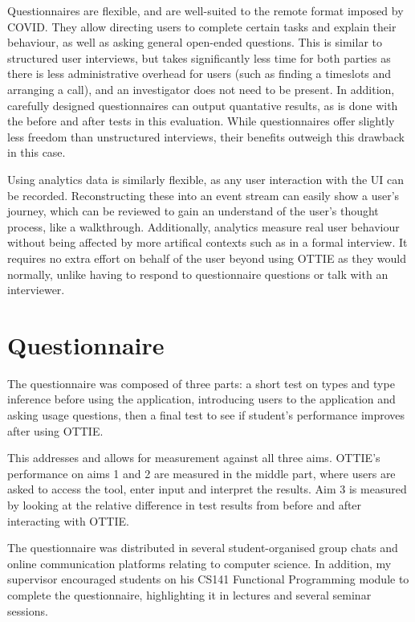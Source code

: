 \documentclass[a4paper,fleqn,oneside,12pt]{report}
\begin{document}
Questionnaires are flexible, and are well-suited to the remote format imposed by COVID. They allow directing users to complete certain tasks and explain their behaviour, as well as asking general open-ended questions. This is similar to structured user interviews, but takes significantly less time for both parties as there is less administrative overhead for users (such as finding a timeslots and arranging a call), and an investigator does not need to be present. In addition, carefully designed questionnaires can output quantative results, as is done with the before and after tests in this evaluation. While questionnaires offer slightly less freedom than unstructured interviews, their benefits outweigh this drawback in this case.

Using analytics data is similarly flexible, as any user interaction with the UI can be recorded. Reconstructing these into an event stream can easily show a user's journey, which can be reviewed to gain an understand of the user's thought process, like a walkthrough. Additionally, analytics measure real user behaviour without being affected by more artifical contexts such as in a formal interview. It requires no extra effort on behalf of the user beyond using OTTIE as they would normally, unlike having to respond to questionnaire questions or talk with an interviewer.

\section{Questionnaire}\label{id:h.yqiowsgjmohq}

The questionnaire was composed of three parts: a short test on types and type inference before using the application, introducing users to the application and asking usage questions, then a final test to see if student's performance improves after using OTTIE.

This addresses and allows for measurement against all three aims. OTTIE's performance on aims 1 and 2 are measured in the middle part, where users are asked to access the tool, enter input and interpret the results. Aim 3 is measured by looking at the relative difference in test results from before and after interacting with OTTIE.

The questionnaire was distributed in several student-organised group chats and online communication platforms relating to computer science. In addition, my supervisor encouraged students on his CS141 Functional Programming module to complete the questionnaire, highlighting it in lectures and several seminar sessions.
\end{document}
